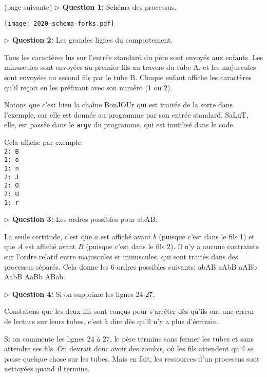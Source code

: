 \documentclass[10pt]{article}\usepackage[enonce]{exemptty}
\begin{document}
\begin{Reponse}
(page suivante)
\newpage
\noindent\textbf{$\triangleright$ Question 1:} Schéma des processus.

\centerline{\texttt{[image: 2020-schema-forks.pdf]}}

\noindent\textbf{$\triangleright$ Question 2:} Les grandes lignes du
comportement.

Tous les caractères lus sur l'entrée standard du père sont envoyés aux
enfants. Les minuscules sont envoyées au premier fils au travers du tube A, et
les majuscules sont envoyées au second fils par le tube B. Chaque enfant affiche
les caractères qu'il reçoit en les préfixant avec son numéro (1 ou 2).

Notons que c'est bien la chaîne BonJOUr qui est traitée de la sorte dans
l'exemple, car elle est donnée au programme par son entrée standard. SaLuT, elle,
est passée dans le \texttt{argv} du programme, qui est inutilisé dans le code.

Cela affiche par exemple: \\
\texttt{2: B\\
1: o\\
1: n\\
2: J\\
2: O\\
2: U\\
1: r}

\bigskip\noindent\textbf{$\triangleright$ Question 3:} Les ordres possibles pour abAB.

La seule certitude, c'est que $a$ est affiché avant $b$ (puisque c'est dans le
fils 1) et que $A$ est affiché avant $B$ (puisque c'est dans le fils 2). Il n'y
a aucune contrainte sur l'ordre relatif entre majuscules et minuscules, qui sont
traités dans des processus séparés. Cela donne les 6 ordres possibles suivants: abAB
aAbB aABb AabB AaBb ABab.

\bigskip\noindent\textbf{$\triangleright$ Question 4:} Si on supprime les lignes 24-27.

Constatons que les deux fils sont conçus pour s'arrêter dès qu'ils ont une
erreur de lecture sur leurs tubes, c'est à dire dès qu'il n'y a plus d'écrivain.

Si on commente les lignes 24 à 27, le père termine sans fermer les tubes et sans
attendre ses fils. On devrait donc avoir des zombis, où les fils attendent qu'il
se passe quelque chose sur les tubes. Mais en fait, les ressources d'un
processus sont nettoyées quand il termine. 


\end{Reponse}
\end{document}
